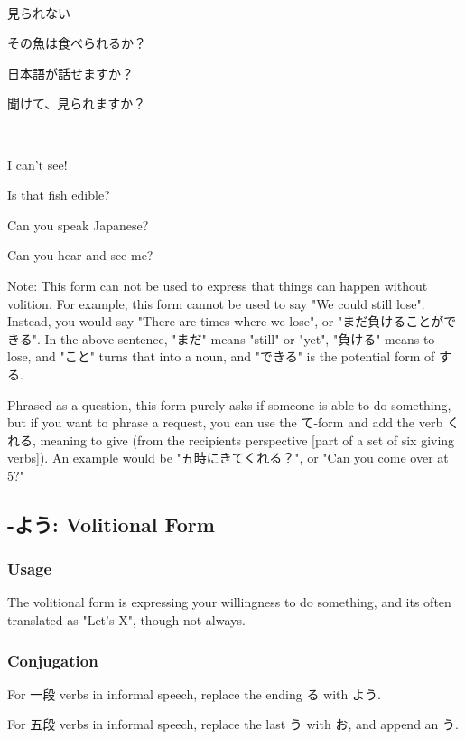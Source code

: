 \documentclass{article}
\begin{document}
\begin{CJK}{UTF8}{min}
\begin{example}
\ 

見られない

その魚は食べられるか？

日本語が話せますか？

聞けて、見られますか？
\end{example}

\begin{solution}
\ 

I can't see!

Is that fish edible?

Can you speak Japanese?

Can you hear and see me?
\end{solution}

Note: This form can not be used to express that things can happen without volition. For example, this form cannot be used to say "We could still lose". Instead, you would say "There are times where we lose", or "まだ負けることができる". In the above sentence, "まだ" means "still" or "yet", "負ける" means to lose, and "こと" turns that into a noun, and "できる" is the potential form of する. 

Phrased as a question, this form purely asks if someone is able to do something, but if you want to phrase a request, you can use the て-form and add the verb くれる, meaning to give (from the recipients perspective [part of a set of six giving verbs]). An example would be "五時にきてくれる？", or "Can you come over at 5?"

\subsection{-よう: Volitional Form}

\subsubsection{Usage}

The volitional form is expressing your willingness to do something, and its often translated as "Let's X", though not always.

\subsubsection{Conjugation}

For 一段 verbs in informal speech, replace the ending る with よう.

For 五段 verbs in informal speech, replace the last う with お, and append an う.


\end{CJK}
\end{document}
